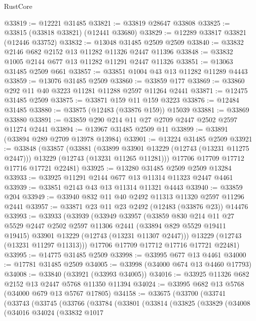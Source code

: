\begin{lexlean}{RustCore}
\begin{coremodule}
@33819 := @12221 @31485
@33821 := @33819 @28647 @33808
@33825 := @33815 (@33818 @33821) (@12441 @33680)
@33829 := @12289 @33817 @33821 (@12446 @33752)
@33832 := @13048 @31485 @2509 @2509
@33840 := @33832 @2146 @682 @2152 @13 @11282 @11326 @2447 @11396
@33848 := @33832 @1005 @2144 @677 @13 @11282 @11291 @2447 @11326
@33851 := @13063 @31485 @2509 @661
@33857 := @33851 @1004 @43 @13 @11282 @11289 @4443
@33859 := @13076 @31485 @2509
@33860 := @33859 @177
@33869 := @33860 @292 @11 @40 @3223 @11281 @11288 @2597 @11264 @2441
@33871 := @12475 @31485 @2509
@33875 := @33871 @159 @11 @159 @3223
@33876 := @12484 @31485
@33880 := @33875 (@12483 (@33876 @159)) @15039
@33881 := @33869 @33880
@33891 := @33859 @290 @214 @11 @27 @2709 @2447 @2502 @2597 @11274 @2441
@33894 := @13967 @31485 @2509 @11
@33899 := @33891 (@33894 @289 @2709 @13978 @13984)
@33901 := @13224 @31485 @2509
@33921 := @33848
    (@33857
      (@33881
        (@33899 @33901 @13229 (@12743 (@13231 @11275 @2447)))
        @13229
        (@12743 (@13231 @11265 @11281)))
      @17706
      @17709
      @17712
      @17716
      @17721
      @22481)
@33925 := @13280 @31485 @2509 @2509 @13284
@33933 := @33925 @11291 @2144 @677 @13 @11314 @11323 @2447 @4461
@33939 := @33851 @2143 @43 @13 @11314 @11321 @4443
@33940 := @33859 @204
@33949 := @33940 @832 @11 @40 @2492 @11313 @11320 @2597 @11296 @2441
@33957 := @33871 @23 @11 @23 @2492 (@12483 (@33876 @23)) @14476
@33993 := @33933
    (@33939
      (@33949
        @33957
        (@33859
          @830
          @214
          @11
          @27
          @5529
          @2447
          @2502
          @2597
          @11306
          @2441
          (@33894 @829 @5529 @19411 @19415)
          @33901
          @13229
          (@12743 (@13231 @11307 @2447)))
        @13229
        (@12743 (@13231 @11297 @11313)))
      @17706
      @17709
      @17712
      @17716
      @17721
      @22481)
@33995 := @14775 @31485 @2509
@33998 := @33995 @677 @13 @4461
@34000 := @17781 @31485 @2509
@34005 := @33998 (@34000 @674 @13 @4460 @17793)
@34008 := @33840 (@33921 (@33993 @34005))
@34016 := @33925 @11326 @682 @2152 @13 @2447 @5768 @11350 @11394
@34024 := @33995 @682 @13 @5768 (@34000 @679 @13 @5767 @17805)
@34158 := @33675
    (@33700
      (@33741
        (@33743
          (@33745
            (@33766
              (@33784
                (@33801
                  (@33814
                    (@33825
                      (@33829
                        (@34008
                          (@34016
                            @34024
                            (@33832
                              @1017

\end{coremodule}
\end{lexlean}
